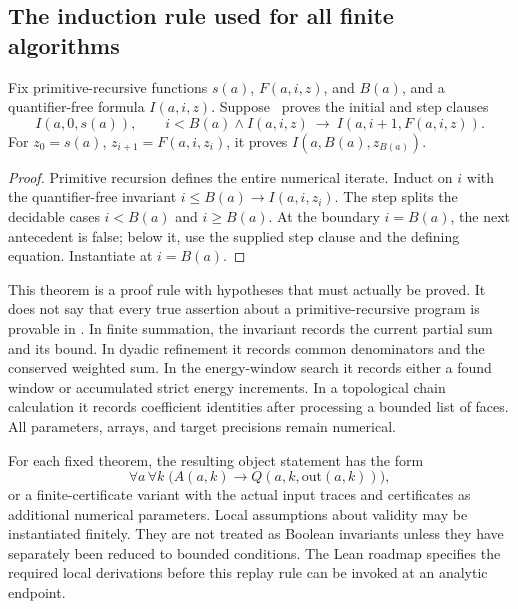 \subsection{The induction rule used for all finite algorithms}

\begin{theorem}\label{thm:replay}
Fix primitive-recursive functions \(s(a)\), \(F(a,i,z)\), and
\(B(a)\), and a quantifier-free formula \(I(a,i,z)\).
Suppose \ipra\ proves the initial and step clauses
\[
 I(a,0,s(a)),\qquad
 i<B(a)\wedge I(a,i,z)\ \longrightarrow\ I(a,i+1,F(a,i,z)).
\]
For \(z_0=s(a)\), \(z_{i+1}=F(a,i,z_i)\), it proves
\(I(a,B(a),z_{B(a)})\).
\end{theorem}
\begin{proof}
Primitive recursion defines the entire numerical iterate. Induct on
\(i\) with the quantifier-free invariant
\(i\leq B(a)\to I(a,i,z_i)\). The step splits the decidable cases
\(i<B(a)\) and \(i\geq B(a)\). At the boundary \(i=B(a)\), the
next antecedent is false; below it, use the supplied step clause and
the defining equation. Instantiate at \(i=B(a)\).
\end{proof}

This theorem is a proof rule with hypotheses that must actually be
proved. It does not say that every true assertion about a
primitive-recursive program is provable in \ipra. In finite summation,
the invariant records the current partial sum and its bound. In
dyadic refinement it records common denominators and the conserved
weighted sum. In the energy-window search it records either a found
window or accumulated strict energy increments. In a topological chain
calculation it records coefficient identities after processing a
bounded list of faces. All parameters, arrays, and target precisions
remain numerical.

For each fixed theorem, the resulting object statement has the form
\[
 \forall a\,\forall k\;\bigl(A(a,k)\to
       Q(a,k,\mathrm{out}(a,k))\bigr),
\]
or a finite-certificate variant with the actual input traces and
certificates as additional numerical parameters. Local assumptions
about validity may be instantiated finitely. They are not treated as
Boolean invariants unless they have separately been reduced to bounded
conditions. The Lean roadmap specifies the required local derivations
before this replay rule can be invoked at an analytic endpoint.
